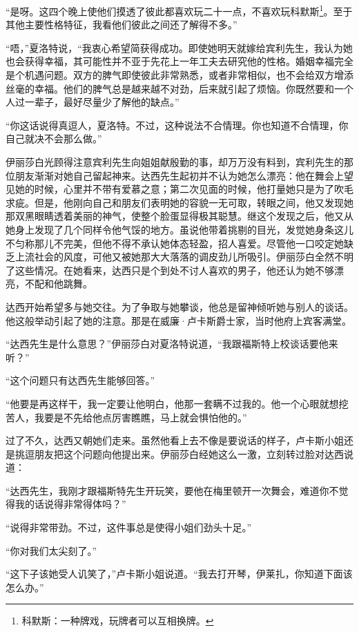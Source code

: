\par “是呀。这四个晚上使他们摸透了彼此都喜欢玩二十一点，不喜欢玩科默斯\footnote{科默斯：一种牌戏，玩牌者可以互相换牌。}。至于其他主要性格特征，我看他们彼此之间还了解得不多。”
\par “唔，”夏洛特说，“我衷心希望简获得成功。即使她明天就嫁给宾利先生，我认为她也会获得幸福，其可能性并不亚于先花上一年工夫去研究他的性格。婚姻幸福完全是个机遇问题。双方的脾气即使彼此非常熟悉，或者非常相似，也不会给双方增添丝毫的幸福。他们的脾气总是越来越不对劲，后来就引起了烦恼。你既然要和一个人过一辈子，最好尽量少了解他的缺点。”
\par “你这话说得真逗人，夏洛特。不过，这种说法不合情理。你也知道不合情理，你自己就决不会那么做。”
\par 伊丽莎白光顾得注意宾利先生向姐姐献殷勤的事，却万万没有料到，宾利先生的那位朋友渐渐对她自己留起神来。达西先生起初并不认为她怎么漂亮：他在舞会上望见她的时候，心里并不带有爱慕之意；第二次见面的时候，他打量她只是为了吹毛求疵。但是，他刚向自己和朋友们表明她的容貌一无可取，转眼之间，他又发现她那双黑眼睛透着美丽的神气，使整个脸蛋显得极其聪慧。继这个发现之后，他又从她身上发现了几个同样令他气馁的地方。虽说他带着挑剔的目光，发觉她身条这儿不匀称那儿不完美，但他不得不承认她体态轻盈，招人喜爱。尽管他一口咬定她缺乏上流社会的风度，可他又被她那大大落落的调皮劲儿所吸引。伊丽莎白全然不明了这些情况。在她看来，达西只是个到处不讨人喜欢的男子，他还认为她不够漂亮，不配和他跳舞。
\par 达西开始希望多与她交往。为了争取与她攀谈，他总是留神倾听她与别人的谈话。他这般举动引起了她的注意。那是在威廉·卢卡斯爵士家，当时他府上宾客满堂。
\par “达西先生是什么意思？”伊丽莎白对夏洛特说道，“我跟福斯特上校谈话要他来听？”
\par “这个问题只有达西先生能够回答。”
\par “他要是再这样干，我一定要让他明白，他那一套瞒不过我的。他一个心眼就想挖苦人，我要是不先给他点厉害瞧瞧，马上就会惧怕他的。”
\par 过了不久，达西又朝她们走来。虽然他看上去不像是要说话的样子，卢卡斯小姐还是挑逗朋友把这个问题向他提出来。伊丽莎白经她这么一激，立刻转过脸对达西说道：
\par “达西先生，我刚才跟福斯特先生开玩笑，要他在梅里顿开一次舞会，难道你不觉得我的话说得非常得体吗？”
\par “说得非常带劲。不过，这件事总是使得小姐们劲头十足。”
\par “你对我们太尖刻了。”
\par “这下子该她受人讥笑了，”卢卡斯小姐说道。“我去打开琴，伊莱扎，你知道下面该怎么办。”
